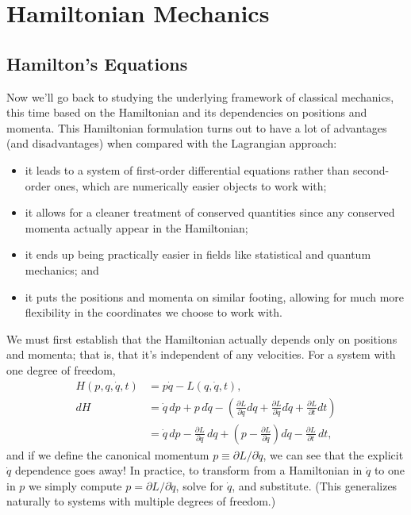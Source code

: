 \documentclass[../p111main.tex]{subfiles}
\begin{document}
\chapter{Hamiltonian Mechanics}
\section{Hamilton's Equations}
Now we'll go back to studying the underlying framework of classical mechanics, this time based on the Hamiltonian and its dependencies on positions and momenta.
This Hamiltonian formulation turns out to have a lot of advantages (and disadvantages) when compared with the Lagrangian approach:
\begin{itemize}[topsep=0pt]
    \item it leads to a system of first-order differential equations rather than second-order ones, which are numerically easier objects to work with;
    \item it allows for a cleaner treatment of conserved quantities since any conserved momenta actually appear in the Hamiltonian;
    \item it ends up being practically easier in fields like statistical and quantum mechanics; and
    \item it puts the positions and momenta on similar footing, allowing for much more flexibility in the coordinates we choose to work with.
\end{itemize}
We must first establish that the Hamiltonian actually depends only on positions and momenta; that is, that it's independent of any velocities.
For a system with one degree of freedom,
\begin{align*}
    H(p, q, \dot q, t) &= p \dot q - L(q, \dot q, t), \\
    dH &= \dot q \,dp + p \,d\dot q - \left( \frac{\partial L}{\partial q} dq + \frac{\partial L}{\partial \dot q} d \dot q + \frac{\partial L}{\partial t} dt \right) \\
    &= \dot q \,dp - \frac{\partial L}{\partial q} \,dq + \left( p - \frac{\partial L}{\partial \dot q} \right) d \dot q - \frac{\partial L}{\partial t} \,dt,
\end{align*}
and if we define the canonical momentum $p \equiv \partial L / \partial \dot q$, we can see that the explicit $\dot q$ dependence goes away!
In practice, to transform from a Hamiltonian in $\dot q$ to one in $p$ we simply compute $p = \partial L / \partial \dot q$, solve for $\dot q$, and substitute.
(This generalizes naturally to systems with multiple degrees of freedom.)
\end{document}
